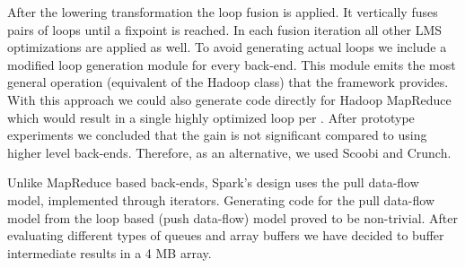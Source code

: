 After the lowering transformation the loop fusion is applied. It vertically fuses pairs of loops until a fixpoint is reached. In each fusion iteration all other LMS optimizations are applied as well. To avoid generating actual  loops we include a modified loop generation module for every back-end. This module emits the most general operation (equivalent of the Hadoop  class) that the framework provides. With this approach we could also generate code directly for Hadoop MapReduce which would result in a single highly optimized loop per . After prototype experiments we concluded that the gain is not significant compared to using higher level back-ends. Therefore, as an alternative, we used Scoobi and Crunch.

Unlike MapReduce based back-ends, Spark's design uses the pull data-flow model, implemented through iterators. Generating code for the pull data-flow model from the loop based (push data-flow) model proved to be non-trivial. After evaluating different types of queues and array buffers we have decided to buffer intermediate results in a 4 MB array.